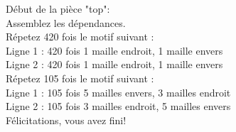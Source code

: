 \documentclass{article}
\begin{document}
Début de la pièce "top":\\
Assemblez les dépendances.\\

Répetez 420 fois le motif suivant :\\
Ligne 1 : 420 fois 1 maille endroit, 1 maille envers\\
Ligne 2 : 420 fois 1 maille endroit, 1 maille envers\\


Répetez 105 fois le motif suivant :\\
Ligne 1 : 105 fois 5 mailles envers, 3 mailles endroit\\
Ligne 2 : 105 fois 3 mailles endroit, 5 mailles envers\\


Félicitations, vous avez fini!
\end{document}
